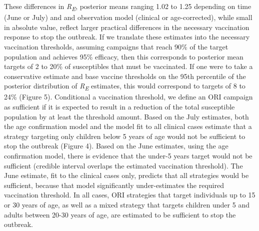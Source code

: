 These differences in \emph{R\textsubscript{E}}, posterior means ranging
1.02 to 1.25 depending on time (June or July) and and observation model
(clinical or age-corrected), while small in absolute value, reflect
larger practical differences in the necessary vaccination response to
stop the outbreak. If we translate these estimates into the necessary
vaccination thresholds, assuming campaigns that reach 90\% of the target
population and achieves 95\% efficacy, then this corresponds to
posterior mean targets of 2 to 20\% of susceptibles that must be
vaccinated. If one were to take a conservative estimate and base vaccine
thresholds on the 95th percentile of the posterior distribution of
\emph{R\textsubscript{E}} estimates, this would correspond to targets of
8 to 24\% (Figure 5). Conditional a vaccination threshold, we define an
ORI campaign as sufficient if it is expected to result in a reduction of
the total susceptible population by at least the threshold amount. Based
on the July estimates, both the age confirmation model and the model fit
to all clinical cases estimate that a strategy targeting only children
below 5 years of age would not be sufficient to stop the outbreak
(Figure 4). Based on the June estimates, using the age confirmation
model, there is evidence that the under-5 years target would not be
sufficient (credible interval overlaps the estimated vaccination
threshold). The June estimate, fit to the clinical cases only, predicts
that all strategies would be sufficient, because that model
significantly under-estimates the required vaccination threshold. In all
cases, ORI strategies that target individuals up to 15 or 30 years of
age, as well as a mixed strategy that targets children under 5 and
adults between 20-30 years of age, are estimated to be sufficient to
stop the outbreak.